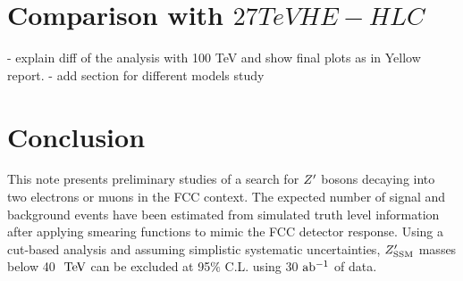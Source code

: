 \documentclass{cernrep}
\begin{document}
\clearpage
\newpage


\section{Comparison with $27 TeV HE-HLC$}
\label{sec:ana27tev}
- explain diff of the analysis with 100 TeV and show final plots as in Yellow report.
- add section for different models study

\section{Conclusion}
This note presents preliminary studies of a search for $Z^{\prime}$ 
bosons decaying into two electrons or muons in the FCC context. The expected number 
of signal and background events have been estimated from simulated truth level information 
after applying smearing functions to mimic the FCC detector response.
Using a cut-based analysis and assuming simplistic systematic uncertainties, $Z^{\prime}_{\mathrm{SSM}}$
masses below 40 $\TeV$ can be excluded at 95$\%$ C.L. 
using 30 $\mbox{ab$^{-1}$}{}$ of data. 



\end{document}
